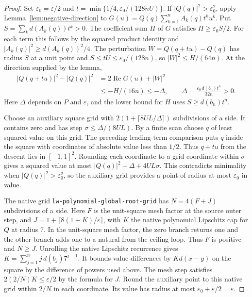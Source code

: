 \documentclass[11pt]{amsart}
\theoremstyle{definition}
\theoremstyle{remark}
\numberwithin{equation}{section}
\newcommand{\re}{\operatorname{Re}}
\newcommand{\code}[1]{\nolinkurl{#1}}
\begin{document}
\begin{proof}
Set $\varepsilon_0=\varepsilon/2$ and
$t=\min\{1/4,\varepsilon_0/(128nU)\}$. If
$|Q(q)|^2>\varepsilon_0^2$, apply Lemma~\ref{lem:negative-direction}
to $G(u)=\overline{Q(q)}\sum_{k=1}^n A_k(q)t^ku^k$.
Put $S=\sum_k d(A_k(q))t^k>0$. The coefficient sum $H$ of
$G$ satisfies $H\ge\varepsilon_0 S/2$. For each term this
follows by the squared product identity and
$|A_k(q)|^2\ge d(A_k(q))^2/4$.
The perturbation $W=Q(q+tu)-Q(q)$ has radius $S$ at a unit
point and $S\le tU\le\varepsilon_0/(128n)$, so
$|W|^2\le H/(64n)$. At the direction supplied by the lemma,
\[
 \begin{split}
 |Q(q+tu)|^2-|Q(q)|^2
   &=2\re G(u)+|W|^2\\
   &\le -H/(16n)\le -\Delta,
 \qquad \Delta=\frac{\varepsilon_0\,d(b_n)t^n}{32n}>0 .
 \end{split}
\]
Here $\Delta$ depends on $P$ and $\varepsilon$, and the
lower bound for $H$ uses $S\ge d(b_n)t^n$.

Choose an auxiliary square grid with
$2(1+\lceil8UL/\Delta\rceil)$ subdivisions of a side.
It contains zero and has step $\sigma\le\Delta/(8UL)$.
By a finite scan choose $q$ of least squared value on this
grid. The preceding leading-term comparison puts $q$ inside
the square with coordinates of absolute value less than $1/2$.
Thus $q+tu$ from the descent lies in $[-1,1]^2$.
Rounding each coordinate to a grid coordinate within $\sigma$
gives a squared value at most $|Q(q)|^2-\Delta+4UL\sigma$.
This contradicts minimality when $|Q(q)|^2>\varepsilon_0^2$,
so the auxiliary grid provides a point of radius at most
$\varepsilon_0$ in value.

The native grid \code{lw-polynomial-global-root-grid} has
$N=4(F+J)$ subdivisions of a side. Here $F$ is the unit-square
mesh factor at the source outer step, and
$J=1+\lceil8(1+K)/\varepsilon\rceil$, with $K$ the native
polynomial Lipschitz cap for $Q$ at radius $7$.
In the unit-square mesh factor, the zero branch returns one
and the other branch adds one to a natural from the ceiling loop.
Thus $F$ is positive and $N\ge J$.
Unrolling the native Lipschitz recurrence gives
$K=\sum_{j=1}^n j\,d(b_j)7^{j-1}$. It bounds value
differences by $K d(x-y)$ on the square by the difference
of powers used above. The mesh step satisfies
$2(2/N)K\le\varepsilon/2$ by the formula for $J$.
Round the auxiliary point to this native grid within $2/N$
in each coordinate. Its value has radius at most
$\varepsilon_0+\varepsilon/2=\varepsilon$.


\end{proof}
\end{document}
